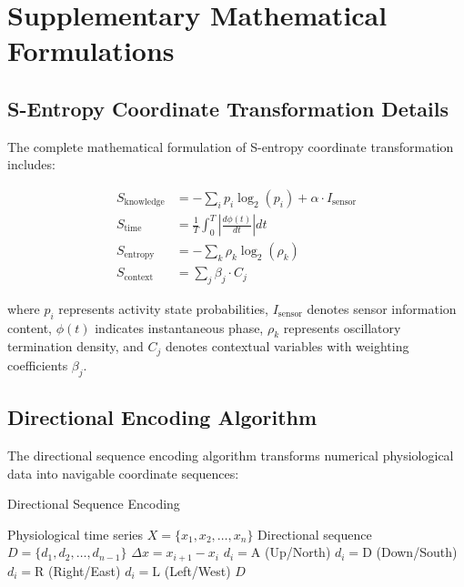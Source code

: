 \documentclass[12pt,a4paper]{article}
\theoremstyle{definition}
\begin{document}
\printbibliography

\appendix

\section{Supplementary Mathematical Formulations}

\subsection{S-Entropy Coordinate Transformation Details}

The complete mathematical formulation of S-entropy coordinate transformation includes:

\begin{align}
S_{\text{knowledge}} &= -\sum_{i} p_i \log_2(p_i) + \alpha \cdot I_{\text{sensor}} \\
S_{\text{time}} &= \frac{1}{T} \int_0^T \left|\frac{d\phi(t)}{dt}\right| dt \\
S_{\text{entropy}} &= -\sum_{k} \rho_k \log_2(\rho_k) \\
S_{\text{context}} &= \sum_{j} \beta_j \cdot C_j
\end{align}

where $p_i$ represents activity state probabilities, $I_{\text{sensor}}$ denotes sensor information content, $\phi(t)$ indicates instantaneous phase, $\rho_k$ represents oscillatory termination density, and $C_j$ denotes contextual variables with weighting coefficients $\beta_j$.

\subsection{Directional Encoding Algorithm}

The directional sequence encoding algorithm transforms numerical physiological data into navigable coordinate sequences:

\begin{algorithm}
\caption{Directional Sequence Encoding}
\begin{algorithmic}
\REQUIRE Physiological time series $X = \{x_1, x_2, \ldots, x_n\}$
\ENSURE Directional sequence $D = \{d_1, d_2, \ldots, d_{n-1}\}$
    \STATE $\Delta x = x_{i+1} - x_i$
        \STATE $d_i = \text{A}$ (Up/North)
        \STATE $d_i = \text{D}$ (Down/South)
        \STATE $d_i = \text{R}$ (Right/East)
    \ELSE
        \STATE $d_i = \text{L}$ (Left/West)
    \ENDIF
\ENDFOR
\RETURN $D$
\end{algorithmic}
\end{algorithm}
\end{document}
